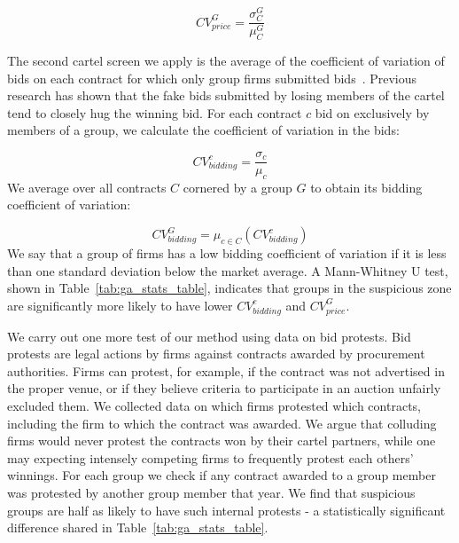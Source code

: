 $$CV_{price}^{G} =\dfrac{\sigma_{C}^{G}}{\mu_{C}^{G}} $$

The second cartel screen we apply is the average of the coefficient of variation of bids on each contract for which only group firms submitted bids~\cite{imhof2017simple}. Previous research has shown that the fake bids submitted by losing members of the cartel tend to closely hug the winning bid. For each contract $c$ bid on exclusively by members of a group, we calculate the coefficient of variation in the bids:

$$CV_{bidding}^{c} =\dfrac{\sigma_{c}}{\mu_{c}} $$
We average over all contracts $C$ cornered by a group $G$ to obtain its bidding coefficient of variation:

$$CV_{bidding}^{G} =\mu_{c \in C}\left(CV_{bidding}^{c}\right) $$
We say that a group of firms has a low bidding coefficient of variation if it is less than one standard deviation below the market average. A Mann-Whitney U test, shown in Table~\ref{tab:ga_stats_table}, indicates that groups in the suspicious zone are significantly more likely to have lower $CV_{bidding}^{c}$ and $CV_{price}^{G}$. 

We carry out one more test of our method using data on bid protests. Bid protests are legal actions by firms against contracts awarded by procurement authorities. Firms can protest, for example, if the contract was not advertised in the proper venue, or if they believe criteria to participate in an auction unfairly excluded them. We collected data on which firms protested which contracts, including the firm to which the contract was awarded. We argue that colluding firms would never protest the contracts won by their cartel partners, while one may expecting intensely competing firms to frequently protest each others' winnings. For each group we check if any contract awarded to a group member was protested by another group member that year. We find that suspicious groups are half as likely to have such internal protests - a statistically significant difference shared in Table~\ref{tab:ga_stats_table}. 

